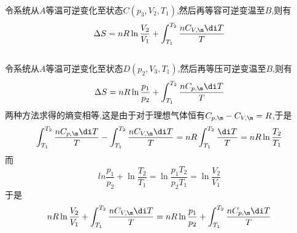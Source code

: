 \documentclass{ctexart}
\begin{document}
\begin{solution}
    \\
    令系统从$A$等温可逆变化至状态$C\left(p_3,V_2,T_1\right)$,然后再等容可逆变温至$B$,则有
    \[\Delta S=nR\ln\dfrac{V_2}{V_1}+\int_{T_1}^{T_2}\dfrac{nC_{V,\m}\di T}{T}\]
    \\
    令系统从$A$等温可逆变化至状态$D\left(p_2,V_3,T_1\right)$,然后再等压可逆变温至$B$,则有
    \[\Delta S=nR\ln\dfrac{p_1}{p_2}+\int_{T_1}^{T_2}\dfrac{nC_{p,\m}\di T}{T}\]
    两种方法求得的熵变相等,这是由于对于理想气体恒有$C_{p,\m}-C_{V,\m}=R$,于是
    \[\int_{T_1}^{T_2}\dfrac{nC_{p,\m}\di T}{T}-\int_{T_1}^{T_2}\dfrac{nC_{V,\m}\di T}{T}=nR\int_{T_1}^{T_2}\dfrac{\di T}{T}=nR\ln\dfrac{T_2}{T_1}\]
    而
    \[ln\dfrac{p_1}{p_2}+\ln\dfrac{T_2}{T_1}=\ln\dfrac{p_1T_2}{p_2T_1}=\ln\dfrac{V_2}{V_1}\]
    于是
    \[nR\ln\dfrac{V_2}{V_1}+\int_{T_1}^{T_2}\dfrac{nC_{V,\m}\di T}{T}=nR\ln\dfrac{p_1}{p_2}+\int_{T_1}^{T_2}\dfrac{nC_{p,\m}\di T}{T}\]
    
\end{solution}
\end{document}
